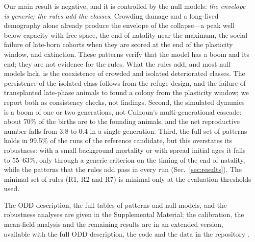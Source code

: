 Our main result is negative, and it is controlled by the null models: \emph{the envelope is generic; the rules add
the classes}. Crowding damage and a long-lived demography alone already produce the envelope of the collapse---a
peak well below capacity with free space, the end of natality near the maximum, the social failure of late-born
cohorts when they are scored at the end of the plasticity window, and extinction. These patterns verify that the
model has a boom and its end; they are not evidence for the rules. What the rules add, and most null models lack,
is the coexistence of crowded and isolated deteriorated classes. The persistence of the isolated class follows from
the refuge design, and the failure of transplanted late-phase animals to found a colony from the plasticity window;
we report both as consistency checks, not findings. Second, the simulated dynamics is a boom of one or two generations, not Calhoun's
multi-generational cascade: about 70\% of the births are to the founding animals, and the net reproductive number
falls from 3.8 to 0.4 in a single generation. Third, the full set of patterns holds in 99.5\% of the runs of the
reference candidate, but this overstates its robustness: with a small background mortality or with spread initial
ages it falls to 55--63\%, only through a generic criterion on the timing of the end of natality, while the patterns
that the rules add pass in every run (Sec.~\ref{sec:results}). The minimal set of rules (R1, R2 and R7) is minimal
only at the evaluation thresholds used.

The ODD description, the full tables of patterns and null models, and the robustness analyses are given in the
Supplemental Material; the calibration, the mean-field analysis and the remaining results are in an extended version, available with the full ODD description, the code and the data in the repository \repourl.
